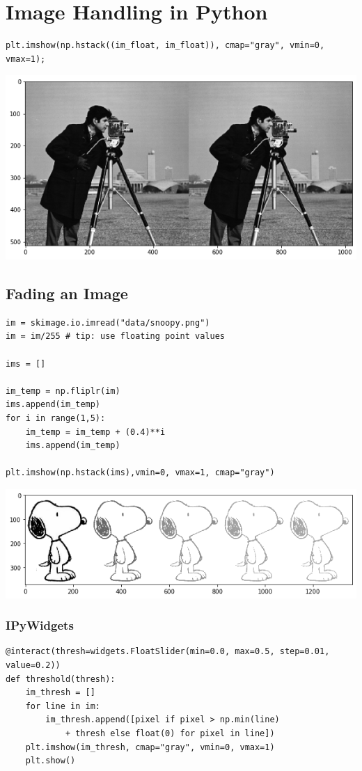 
\section{Image Handling in Python}

\begin{verbatim}
plt.imshow(np.hstack((im_float, im_float)), cmap="gray", vmin=0, vmax=1);
\end{verbatim}

\begin{center}
	\includegraphics[width=0.7\linewidth]{img/hstack_image}
\end{center}

\subsection{Fading an Image}
\begin{verbatim}
im = skimage.io.imread("data/snoopy.png")
im = im/255 # tip: use floating point values

ims = []

im_temp = np.fliplr(im)
ims.append(im_temp)
for i in range(1,5):
	im_temp = im_temp + (0.4)**i
	ims.append(im_temp)

plt.imshow(np.hstack(ims),vmin=0, vmax=1, cmap="gray")
\end{verbatim}

\begin{center}
	\includegraphics[width=0.7\linewidth]{img/snoopy_fade}
\end{center}

\subsubsection{IPyWidgets}
\begin{verbatim}
@interact(thresh=widgets.FloatSlider(min=0.0, max=0.5, step=0.01, value=0.2))
def threshold(thresh):
	im_thresh = []
	for line in im:
		im_thresh.append([pixel if pixel > np.min(line)
			+ thresh else float(0) for pixel in line])
	plt.imshow(im_thresh, cmap="gray", vmin=0, vmax=1)
	plt.show()
\end{verbatim}

